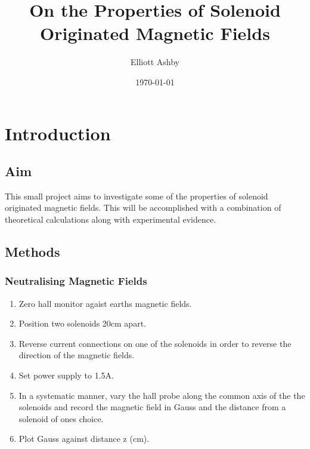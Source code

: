 \documentclass{article}
\title{On the Properties of Solenoid Originated Magnetic Fields} %
\author{Elliott Ashby}
\date{\today}
\begin{document}
    \maketitle
    
    \section{Introduction}
    
    \subsection{Aim}
    This small project aims to investigate some of the properties of 
    solenoid originated magnetic fields. 
    \newline This will be accomplished with a combination of theoretical 
    calculations along with experimental evidence.
    \subsection{Methods}
    \subsubsection{Neutralising Magnetic Fields}
    \begin{enumerate}
        \item Zero hall monitor agaist earths magnetic fields.
        \item Position two solenoids 20cm apart.
        \item Reverse current connections on one of the solenoids in order to reverse the direction of the magnetic fields.
        \item Set power supply to 1.5A.
        \item In a systematic manner, vary the hall probe along the common axis of the the solenoids and record the magnetic field in Gauss and the distance from a solenoid of ones choice.
        \item Plot Gauss against distance z (cm).
    \end{enumerate}
\end{document}
